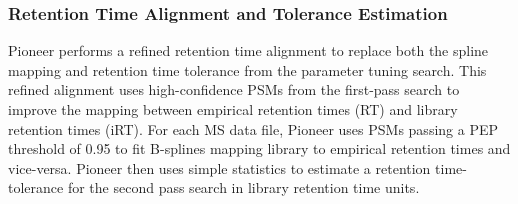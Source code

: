 \documentclass[pdflatex,sn-nature]{sn-jnl}
\begin{document}
\subsubsection{Retention Time Alignment and Tolerance Estimation}

Pioneer performs a refined retention time alignment to replace both the spline mapping and retention time tolerance from the parameter tuning search. This refined alignment uses high-confidence PSMs from the first-pass search to improve the mapping between empirical retention times (RT) and library retention times (iRT). For each MS data file, Pioneer uses PSMs passing a PEP threshold of 0.95 to fit B-splines mapping library to empirical retention times and vice-versa. Pioneer then uses simple statistics to estimate a retention time-tolerance for the second pass search in library retention time units. 
\end{document}
